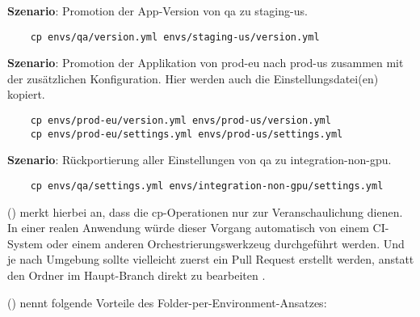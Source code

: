 \noindent
\textbf{Szenario}: Promotion der App-Version von qa zu staging-us.

\begin{verbatim}
	cp envs/qa/version.yml envs/staging-us/version.yml
\end{verbatim}

\noindent
\textbf{Szenario}: Promotion der Applikation von prod-eu nach prod-us zusammen mit der zusätzlichen Konfiguration. Hier werden auch die Einstellungsdatei(en) kopiert.

\begin{verbatim}
	cp envs/prod-eu/version.yml envs/prod-us/version.yml
	cp envs/prod-eu/settings.yml envs/prod-us/settings.yml
\end{verbatim}

\noindent
\textbf{Szenario}: Rückportierung aller Einstellungen von qa zu integration-non-gpu.

\begin{verbatim}
	cp envs/qa/settings.yml envs/integration-non-gpu/settings.yml
\end{verbatim}

\noindent
\citeauthor{codefreshHowToModelGitOpsEnvironmentsAndPromote} (\citeyear{codefreshHowToModelGitOpsEnvironmentsAndPromote})
merkt hierbei an,
dass die cp-Operationen nur zur Veranschaulichung dienen. 
In einer realen Anwendung würde dieser Vorgang automatisch von einem CI-System 
oder einem anderen Orchestrierungswerkzeug durchgeführt werden. Und je nach Umgebung 
sollte vielleicht zuerst ein Pull Request erstellt werden, anstatt den Ordner im Haupt-Branch direkt zu bearbeiten
\autocite{codefreshHowToModelGitOpsEnvironmentsAndPromote}.
\bigskip

\noindent
\citeauthor{codefreshHowToModelGitOpsEnvironmentsAndPromote} (\citeyear{codefreshHowToModelGitOpsEnvironmentsAndPromote})
nennt folgende Vorteile des Folder-per-Environment-Ansatzes:

